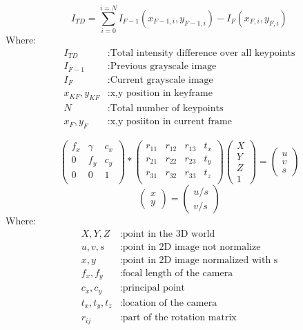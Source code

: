 \documentclass[11pt,a4paper,titlepage,oneside]{report}
\begin{document}
\begin{equation}\label{eq:intensity}
	I_{TD}=\sum_{i=0}^{i=N}I_{F-1}(x_{F-1,i},y_{F-1,i})-I_{F}(x_{F,i},y_{F,i})
\end{equation}
Where:
\begin{align*}
	I_{TD} &:					\text{Total intensity difference over all keypoints}\\
	I_{F-1} &:				\text{Previous grayscale image}\\
	I_{F} &:					\text{Current grayscale image}\\
	x_{KF},y_{KF} &:	\text{x,y position in keyframe}\\
	N &:							\text{Total number of keypoints}\\
	x_{F},y_{F} &:		\text{x,y posiiton in current frame}
\end{align*}

\begin{equation}\label{eq:cm}
  \begin{pmatrix}
		f_x & \gamma & c_x \\
		0 & f_y & c_y \\
		0 & 0 & 1 \\
	\end{pmatrix}*
	\begin{pmatrix}
		r_{11} & r_{12} & r_{13} & t_x \\
		r_{21} & r_{22} & r_{23} & t_y \\
		r_{31} & r_{32} & r_{33} & t_z \\
	\end{pmatrix}
	\begin{pmatrix}
		X \\
		Y \\
		Z \\
		1
	\end{pmatrix}=
	\begin{pmatrix}
		u \\
		v \\
		s
  \end{pmatrix}
\end{equation}
\begin{equation}\label{eq:cm_normalized}
	\begin{pmatrix}
		x \\
		y
	\end{pmatrix}=
	\begin{pmatrix}
		u/s \\
		v/s 
  \end{pmatrix}
\end{equation}
Where:
\begin{align*}
  X,Y,Z			&: \text{point in the 3D world}\\
	u,v,s	   	&: \text{point in 2D image not normalize}\\
	x,y				&: \text{point in 2D image normalized with s}\\
	f_x,f_y  	&: \text{focal length of the camera}\\
  c_x,c_y  	&: \text{principal point}\\
  t_x,t_y,t_z	&: \text{location of the camera}\\
  r_{ij}	&: \text{part of the rotation matrix}
\end{align*}
\end{document}
